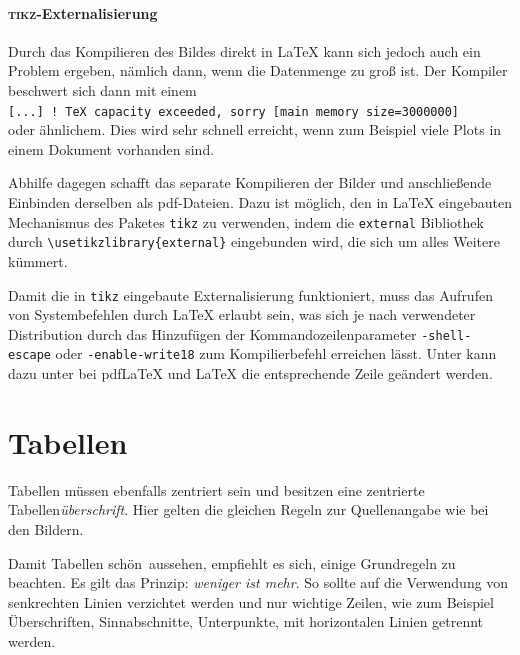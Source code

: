 \paragraph*{\textsc{tikz}-Externalisierung}
Durch das Kompilieren des Bildes direkt in \LaTeX{} kann sich jedoch auch ein Problem ergeben, nämlich dann, wenn die Datenmenge zu groß ist.
Der Kompiler beschwert sich dann mit einem\\
\texttt{[...] ! TeX capacity exceeded, sorry [main memory size=3000000]}\\
oder ähnlichem.
Dies wird sehr schnell erreicht, wenn zum Beispiel viele Plots in einem Dokument vorhanden sind.

Abhilfe dagegen schafft das separate Kompilieren der Bilder und anschließende Einbinden derselben als pdf-Dateien.
Dazu ist \zB möglich, den in \LaTeX{} eingebauten Mechanismus des Paketes \texttt{tikz} zu verwenden, indem die \texttt{external} Bibliothek durch \verb|\usetikzlibrary{external}| eingebunden wird, die sich um alles Weitere kümmert.

Damit die in \texttt{tikz} eingebaute Externalisierung funktioniert, muss das Aufrufen von Systembefehlen durch \LaTeX{} erlaubt sein, was sich je nach verwendeter Distribution durch das Hinzufügen der Kommandozeilenparameter \texttt{-shell-escape} oder \texttt{-enable-write18} zum Kompilierbefehl erreichen lässt.
Unter \Texstudio{} kann dazu unter  bei pdf\LaTeX{} und \LaTeX{} die entsprechende Zeile geändert werden.



\section{Tabellen}
Tabellen müssen ebenfalls zentriert sein und besitzen eine zentrierte Tabellen\emph{überschrift}. Hier gelten die gleichen Regeln zur Quellenangabe wie bei den Bildern.

Damit Tabellen \glqq schön\grqq\ aussehen, empfiehlt es sich, einige Grundregeln zu beachten.
Es gilt das Prinzip: \emph{weniger ist mehr}.
So sollte auf die Verwendung von senkrechten Linien verzichtet werden und nur wichtige Zeilen, wie zum Beispiel Überschriften, Sinnabschnitte, Unterpunkte, \etc mit horizontalen Linien getrennt werden.

